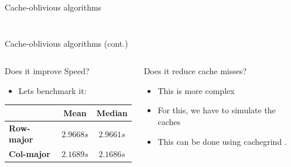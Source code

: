 \documentclass[compress,aspectratio=169]{beamer}
\begin{document}
\begin{frame}{Cache-oblivious algorithms \cite{frigo}}
\begin{columns}
\begin{column}{0.5\textwidth}
      \cite{cmglee}
    \end{column}
  \end{columns}
\end{frame}

\begin{frame}{Cache-oblivious algorithms (cont.)}
  \begin{columns}
    \begin{column}{0.5\textwidth}
      \begin{block}{Does it improve Speed?}
        \begin{itemize}
          \item Lets benchmark it:
        \end{itemize}
  \begin{table}[h]
\begin{tabular}{|l|c|c|}
\hline
    & \textbf{Mean} & \textbf{Median}\\
\hline
    \textbf{Row-major} & $2.9668s$ & $2.9661 s$\\
  \hline
    \textbf{Col-major} & $2.1689 s$ & $2.1686 s$\\
\hline
\end{tabular}
\end{table}
      \end{block}
    \end{column}
    \begin{column}{0.5\textwidth}
      \begin{block}{Does it reduce cache misses?}
        \begin{itemize}
          \item This is more complex
          \item For this, we have to simulate the caches
          \item This can be done using cachegrind \cite{valgrind}.
        \end{itemize}
      \end{block}
    \end{column}
  \end{columns}
\end{frame}
\end{document}
